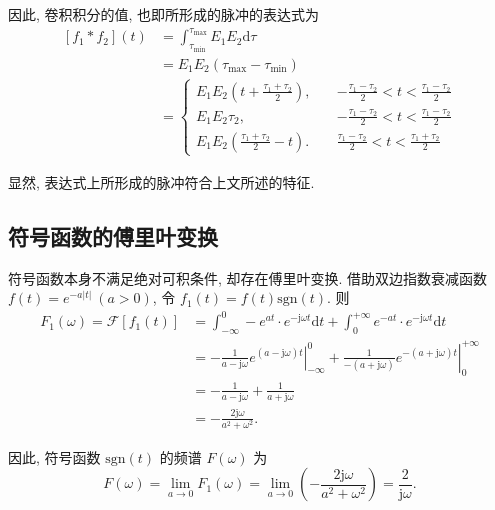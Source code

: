 因此, 卷积积分的值, 也即所形成的脉冲的表达式为
\begin{align}
    \nonumber [f_1*f_2](t) & =\int_{\tau_\mathrm{min}}^{\tau_\mathrm{max}}E_1E_2\mathrm{d}\tau                                                      \\
    \nonumber              & =E_1E_2(\tau_\mathrm{max}-\tau_\mathrm{min})                                                                           \\
                           & =\begin{cases}
                                  \displaystyle
                                  E_1E_2\left(t+\frac{\tau_1+\tau_2}{2}\right),\quad & \displaystyle -\frac{\tau_1-\tau_2}{2}<t<\frac{\tau_1-\tau_2}{2} \\
                                  \displaystyle
                                  E_1E_2\tau_2,\quad                                 & \displaystyle -\frac{\tau_1-\tau_2}{2}<t<\frac{\tau_1-\tau_2}{2} \\
                                  \displaystyle
                                  E_1E_2\left(\frac{\tau_1+\tau_2}{2}-t\right).\quad & \displaystyle \frac{\tau_1-\tau_2}{2}<t<\frac{\tau_1+\tau_2}{2}
                              \end{cases}
\end{align}

显然, 表达式上所形成的脉冲符合上文所述的特征.

\subsection{符号函数的傅里叶变换} \label{proofs 符号函数的傅里叶变换}
符号函数本身不满足绝对可积条件, 却存在傅里叶变换. 借助双边指数衰减函数 $f(t)=e^{-a|t|}\ (a>0)$, 令 $f_1(t)=f(t)\mathrm{sgn}(t)$. 则
\begin{equation}
    \begin{aligned}
        F_1(\omega)=\mathcal{F}[f_1(t)] & =\int_{-\infty}^{0}-e^{at}\cdot e^{-\mathrm{j}\omega t}\mathrm{d}t+\int_{0}^{+\infty}e^{-at}\cdot e^{-\mathrm{j}\omega t}\mathrm{d}t                                    \\
                                        & =\left.-\frac{1}{a-\mathrm{j}\omega}e^{(a-\mathrm{j}\omega)t}\right|_{-\infty}^{0}+\left.\frac{1}{-(a+\mathrm{j}\omega)}e^{-(a+\mathrm{j}\omega)t}\right|_{0}^{+\infty} \\
                                        & =-\frac{1}{a-\mathrm{j}\omega}+\frac{1}{a+\mathrm{j}\omega}                                                                                                             \\
                                        & =-\frac{2\mathrm{j}\omega}{a^2+\omega^2}.
    \end{aligned}
\end{equation}

因此, 符号函数 $\mathrm{sgn}(t)$ 的频谱 $F(\omega)$ 为
\begin{equation}
    F(\omega)=\lim_{a\rightarrow 0}F_1(\omega)=\lim_{a\rightarrow 0}\left(-\frac{2\mathrm{j}\omega}{a^2+\omega^2}\right)=\frac{2}{\mathrm{j}\omega}.
\end{equation}
